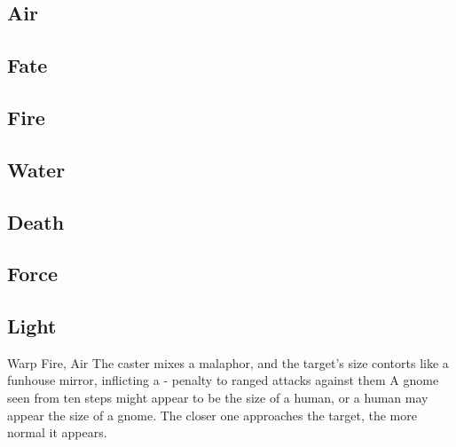 \begin{multicols}{2}

\subsection{Air}


\subsection{Fate}


\subsection{Fire}


\subsection{Water}


\subsection{Death}


\subsection{Force}


\subsection{Light}

  {}%
  {Warp}%
  {Fire, Air}%
  {}%
  {The caster mixes a malaphor, and the target's size contorts like a funhouse mirror, inflicting a - penalty to ranged attacks against them}%
  {A gnome seen from ten steps might appear to be the size of a human, or a human may appear the size of a gnome.
    The closer one approaches the target, the more normal it appears.}



\end{multicols}
